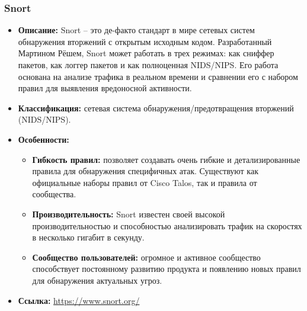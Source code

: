 \subsubsection{Snort}
\begin{itemize}
		\item \textbf{Описание:} Snort -- это де-факто стандарт в мире сетевых систем обнаружения вторжений с открытым исходным кодом. Разработанный Мартином Рёшем, Snort может работать в трех режимах: как сниффер пакетов, как логгер пакетов и как полноценная NIDS/NIPS. Его работа основана на анализе трафика в реальном времени и сравнении его с набором правил для выявления вредоносной активности.
    \item \textbf{Классификация:} сетевая система обнаружения/предотвращения вторжений (NIDS/NIPS).
    \item \textbf{Особенности:}
    \begin{itemize}
        \item \textbf{Гибкость правил:} позволяет создавать очень гибкие и детализированные правила для обнаружения специфичных атак. Существуют как официальные наборы правил от Cisco Talos, так и правила от сообщества.
        \item \textbf{Производительность:} Snort известен своей высокой производительностью и способностью анализировать трафик на скоростях в несколько гигабит в секунду.
        \item \textbf{Сообщество пользователей:} огромное и активное сообщество способствует постоянному развитию продукта и появлению новых правил для обнаружения актуальных угроз.
    \end{itemize}
    \item \textbf{Ссылка:} \url{https://www.snort.org/}
\end{itemize}

